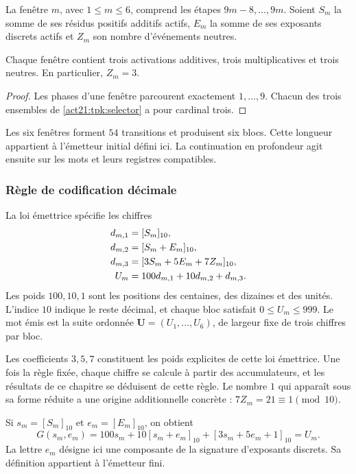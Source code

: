 La fenêtre \(m\), avec \(1\leq m\leq6\), comprend les étapes
\(9m-8,\ldots,9m\). Soient \(S_m\) la somme de ses résidus positifs
additifs actifs, \(E_m\) la somme de ses exposants discrets actifs et
\(Z_m\) son nombre d'événements neutres.

\begin{lemma}
\label{act21:tpk:tres-eventos}
Chaque fenêtre contient trois activations additives, trois multiplicatives et
trois neutres. En particulier, \(Z_m=3\).
\end{lemma}
\begin{proof}
Les phases d'une fenêtre parcourent exactement \(1,\ldots,9\). Chacun
des trois ensembles de \eqref{act21:tpk:selector} a pour cardinal trois.
\end{proof}

Les six fenêtres forment \(54\) transitions et produisent six blocs.  
Cette longueur appartient à l'émetteur initial défini ici. La continuation  
en profondeur agit ensuite sur les mots et leurs registres compatibles.

\subsubsection{Règle de codification décimale}

La loi émettrice spécifie les chiffres
\begin{align}
 d_{m,1}&=[S_m]_{10},\notag\\
 d_{m,2}&=[S_m+E_m]_{10},\notag\\
 d_{m,3}&=[3S_m+5E_m+7Z_m]_{10},\notag\\
 U_m&=100d_{m,1}+10d_{m,2}+d_{m,3}.
 \label{act21:tpk:bloque-decimal}
\end{align}
Les poids \(100,10,1\) sont les positions des centaines, des dizaines et des unités.
L'indice \(10\) indique le reste décimal, et chaque bloc satisfait
\(0\leq U_m\leq999\). Le mot émis est la suite ordonnée
\(\mathbf U=(U_1,\ldots,U_6)\), de largeur fixe de trois chiffres par bloc.

Les coefficients \(3,5,7\) constituent les poids explicites de cette loi
émettrice. Une fois la règle fixée, chaque chiffre se calcule à partir des
accumulateurs, et les résultats de ce chapitre se déduisent de cette règle.
Le nombre \(1\) qui apparaît sous sa forme réduite a une origine
additionnelle concrète : \(7Z_m=21\equiv1\pmod{10}\).

Si \(s_m=[S_m]_{10}\) et \(e_m=[E_m]_{10}\), on obtient
\begin{equation}
 G(s_m,e_m)=100s_m+10[s_m+e_m]_{10}
                   +[3s_m+5e_m+1]_{10}=U_m.
 \label{act21:tpk:acoplamiento-firmas}
\end{equation}
La lettre \(e_m\) désigne ici une composante de la signature d'exposants discrets. Sa définition appartient à l'émetteur fini.

